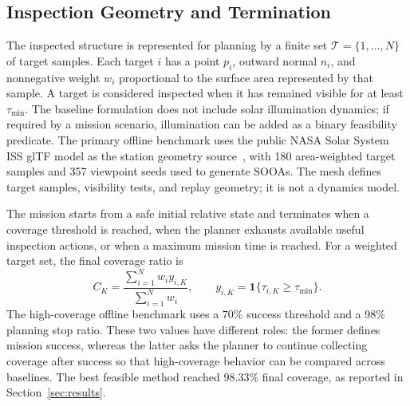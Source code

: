 \subsection{Inspection Geometry and Termination}

The inspected structure is represented for planning by a finite set
$\mathcal{T}=\{1,\ldots,N\}$ of target samples. Each target $i$ has a point
$p_i$, outward normal $n_i$, and nonnegative weight $w_i$ proportional to the
surface area represented by that sample. A target is considered inspected when
it has remained visible for at least $\tau_{\min}$. The baseline formulation
does not include solar illumination dynamics; if required by a mission
scenario, illumination can be added as a binary feasibility predicate. The
primary offline benchmark uses the public NASA Solar System ISS glTF model as
the station geometry source~\cite{nasa_iss_gltf_model}, with 180
area-weighted target samples and 357 viewpoint seeds used to generate SOOAs. The mesh defines
target samples, visibility tests, and replay geometry; it is not a dynamics
model.

The mission starts from a safe initial relative state and terminates when a
coverage threshold is reached, when the planner exhausts available useful
inspection actions, or when a maximum mission time is reached. For a weighted target
set, the final coverage ratio is
\begin{equation}
  C_K = \frac{\sum_{i=1}^{N} w_i y_{i,K}}{\sum_{i=1}^{N} w_i},
  \qquad
  y_{i,K}=\mathbf{1}\{\tau_{i,K}\ge \tau_{\min}\}.
\end{equation}
The high-coverage offline benchmark uses a 70\% success threshold and a 98\%
planning stop ratio. These two values have different roles: the former defines
mission success, whereas the latter asks the planner to continue collecting
coverage after success so that high-coverage behavior can be compared across
baselines. The best feasible method reached 98.33\% final coverage, as
reported in Section~\ref{sec:results}.
